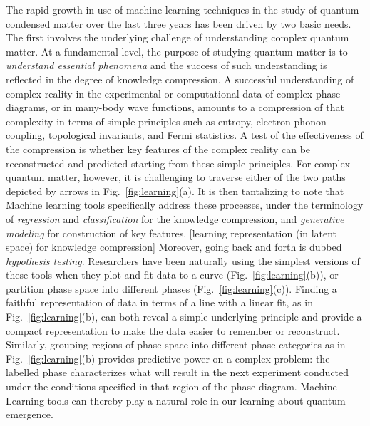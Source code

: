\documentclass[aps,prb,floatfix,amsmath,amssymb,amsfonts,10pt,floatfix,longbibliography]{revtex4-1}
\begin{document}
The rapid growth in use of %
machine learning techniques
in the study of quantum condensed matter over the last three years has 
been driven by two basic needs.
The first involves the underlying challenge of understanding complex quantum matter.
At a fundamental level, the purpose of studying quantum matter is to {\it understand essential phenomena\/} and the success of such understanding is reflected in the degree of knowledge compression\cite{kivelson-complexity}. A successful understanding of complex reality in the experimental or computational data of complex phase diagrams, or in many-body wave functions, amounts to a compression of that complexity in terms of simple principles such as entropy, electron-phonon coupling, topological invariants, and Fermi statistics. A test of the effectiveness of the compression is whether key features of the complex reality can be reconstructed and predicted starting from these simple principles.
For complex quantum matter, however, it is challenging to traverse either of the two paths depicted by arrows in Fig.~\ref{fig:learning}(a). It is then tantalizing to note that Machine learning tools specifically address these processes, under the terminology of {\it regression\/} and {\it classification\/} for the knowledge compression, and {\it generative modeling\/} for construction of key features. [learning representation (in latent space) for knowledge compression] Moreover, going back and forth is dubbed {\it hypothesis testing}.
Researchers have been naturally using the simplest versions of these tools when they plot and fit  data to a curve (Fig.~\ref{fig:learning}(b)), or partition phase space into different phases (Fig.~\ref{fig:learning}(c)). Finding a faithful representation of data in terms of a line with a linear fit, as in Fig.~\ref{fig:learning}(b), can both reveal a simple underlying principle and provide a compact representation to make the data easier to remember or reconstruct.  Similarly, grouping regions of phase space into different phase categories as in Fig.~\ref{fig:learning}(b) provides predictive power on a complex problem: the labelled phase characterizes what will result in the next experiment conducted under the conditions specified in that region of the phase diagram. Machine Learning tools can thereby play a natural role in our learning about quantum emergence. 
\end{document}
